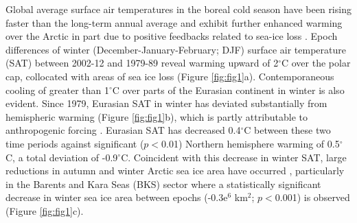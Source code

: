 \documentclass{nature}
\begin{document}
Global average surface air temperatures in the boreal cold season have been rising faster than the long-term annual average \cite{wallace12} and exhibit further enhanced warming over the Arctic in part due to positive feedbacks related to sea-ice loss \cite{screen10,cohen14}. Epoch differences of winter (December-January-February; DJF) surface air temperature (SAT) between 2002-12 and 1979-89 reveal warming upward of 2$^\circ$C over the polar cap, collocated with areas of sea ice loss (Figure \ref{fig:fig1}a). Contemporaneous cooling of greater than 1$^\circ$C over parts of the Eurasian continent in winter is also evident. Since 1979, Eurasian SAT in winter has deviated substantially from hemispheric warming (Figure \ref{fig:fig1}b), which is partly attributable to anthropogenic forcing \cite{gillett08,qian15}. Eurasian SAT has decreased 0.4$^\circ$C between these two time periods against significant ($p<$0.01)  Northern hemisphere warming of 0.5$^\circ$C, a total deviation of -0.9$^\circ$C. Coincident with this decrease in winter SAT, large reductions in autumn and winter Arctic sea ice area have occurred \cite{simmonds15}, particularly in the Barents and Kara Seas (BKS) sector where a statistically significant decrease in winter sea ice area between epochs (-0.3e$^6$ km$^2$; $p<$0.001) is observed (Figure \ref{fig:fig1}c). %


\end{document}
